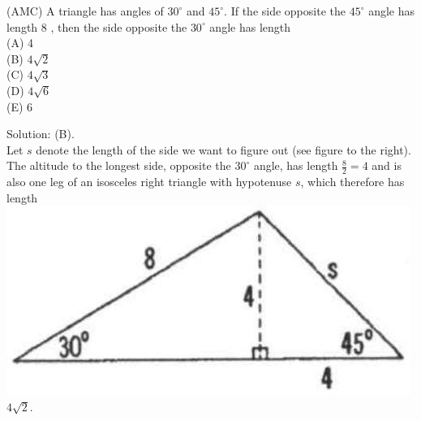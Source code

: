\documentclass{article}
\begin{document}
(AMC) A triangle has angles of \(30^{\circ}\) and \(45^{\circ}\). If the side opposite the \(45^{\circ}\) angle has length 8 , then the side opposite the \(30^{\circ}\) angle has length\\
(A) 4\\
(B) \(4 \sqrt{2}\)\\
(C) \(4 \sqrt{3}\)\\
(D) \(4 \sqrt{6}\)\\
(E) 6

Solution: (B).\\
Let \(s\) denote the length of the side we want to figure out (see figure to the right). The altitude to the longest side, opposite the \(30^{\circ}\) angle, has length \(\frac{8}{2}=4\) and is also one leg of an isosceles right triangle with hypotenuse \(s\), which therefore has length\\
\includegraphics[width=\textwidth]{images/075(1).jpg} \(4 \sqrt{2}\).
\end{document}
